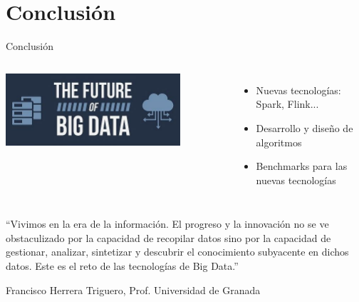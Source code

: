 
\section{Conclusión}

	\begin{frame}{Conclusión}
		\centering
		\fontsize{8}{8}\selectfont

		\kern-3mm
		\begin{columns}
				\begin{center}
					\includegraphics[width=0.8\textwidth]{./Images/big-data-future.jpg}					
				\end{center}
				\kern 2mm
				\begin{itemize}
					\item Nuevas tecnologías: Spark, Flink...
					\item Desarrollo y diseño de algoritmos
					\item Benchmarks para las nuevas tecnologías
				\end{itemize}
		\end{columns}			

		\fontsize{7}{7}\selectfont		
		\begin{tcolorbox}[colback=ChetwodeBlue!10,colframe=ChetwodeBlue!60]
			``Vivimos en la era de la información. El progreso y la innovación no se ve obstaculizado por la capacidad de recopilar datos sino por la capacidad de gestionar, analizar, sintetizar y descubrir el conocimiento subyacente en dichos datos. Este es el reto de las tecnologías de Big Data.''
			\begin{flushright}
				Francisco Herrera Triguero, Prof. Universidad de Granada
			\end{flushright}
		\end{tcolorbox}
	\end{frame}
